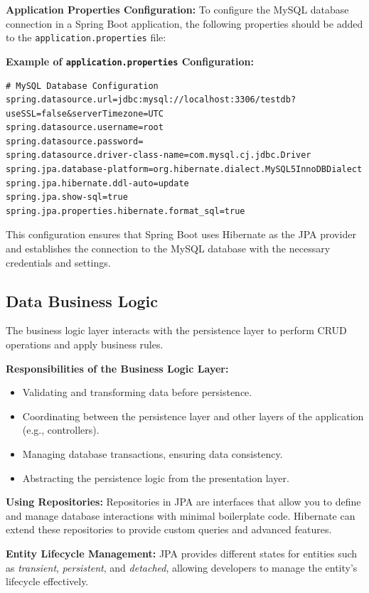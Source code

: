 \documentclass{article}
\begin{document}
\textbf{Application Properties Configuration:}
To configure the MySQL database connection in a Spring Boot application, the following properties should be added to the \texttt{application.properties} file:

\textbf{Example of \texttt{application.properties} Configuration:}

\begin{lstlisting}[language=properties]
# MySQL Database Configuration
spring.datasource.url=jdbc:mysql://localhost:3306/testdb?useSSL=false&serverTimezone=UTC
spring.datasource.username=root
spring.datasource.password=
spring.datasource.driver-class-name=com.mysql.cj.jdbc.Driver
spring.jpa.database-platform=org.hibernate.dialect.MySQL5InnoDBDialect
spring.jpa.hibernate.ddl-auto=update
spring.jpa.show-sql=true
spring.jpa.properties.hibernate.format_sql=true
\end{lstlisting}

This configuration ensures that Spring Boot uses Hibernate as the JPA provider and establishes the connection to the MySQL database with the necessary credentials and settings.

\subsection{Data Business Logic}

The business logic layer interacts with the persistence layer to perform CRUD operations and apply business rules.

\textbf{Responsibilities of the Business Logic Layer:}
\begin{itemize}
    \item Validating and transforming data before persistence.
    \item Coordinating between the persistence layer and other layers of the application (e.g., controllers).
    \item Managing database transactions, ensuring data consistency.
    \item Abstracting the persistence logic from the presentation layer.
\end{itemize}

\textbf{Using Repositories:}
Repositories in JPA are interfaces that allow you to define and manage database interactions with minimal boilerplate code. Hibernate can extend these repositories to provide custom queries and advanced features.

\textbf{Entity Lifecycle Management:}
JPA provides different states for entities such as \textit{transient}, \textit{persistent}, and \textit{detached}, allowing developers to manage the entity's lifecycle effectively.
\end{document}
